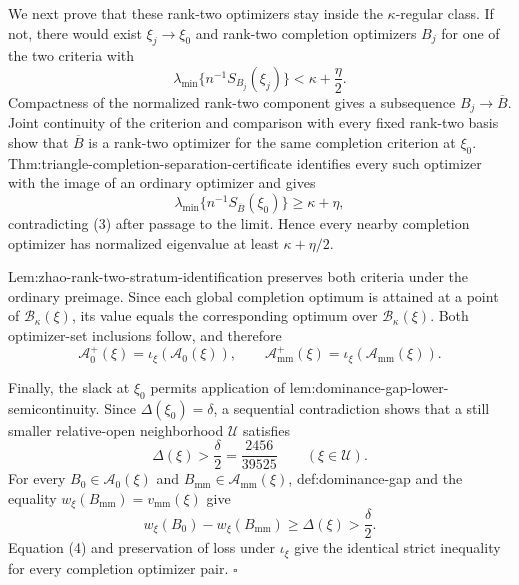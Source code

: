 We next prove that these rank-two optimizers stay inside the \(\kappa\)-regular class.  If not, there would exist \(\xi_j\to\xi_0\) and rank-two completion optimizers \(B_j\) for one of the two criteria with
\[
\lambda_{\min}\{n^{-1}S_{B_j}(\xi_j)\}<\kappa+\frac\eta2.        \tag{3}
\]
Compactness of the normalized rank-two component gives a subsequence \(B_j\to\overline B\).  Joint continuity of the criterion and comparison with every fixed rank-two basis show that \(\overline B\) is a rank-two optimizer for the same completion criterion at \(\xi_0\).  Thm:triangle-completion-separation-certificate identifies every such optimizer with the image of an ordinary optimizer and gives
\[
\lambda_{\min}\{n^{-1}S_{\overline B}(\xi_0)\}\ge\kappa+\eta,
\]
contradicting (3) after passage to the limit.  Hence every nearby completion optimizer has normalized eigenvalue at least \(\kappa+\eta/2\).

Lem:zhao-rank-two-stratum-identification preserves both criteria under the ordinary preimage.  Since each global completion optimum is attained at a point of \(\mathcal B_\kappa(\xi)\), its value equals the corresponding optimum over \(\mathcal B_\kappa(\xi)\).  Both optimizer-set inclusions follow, and therefore
\[
\mathcal A_0^+(\xi)=\iota_\xi(\mathcal A_0(\xi)),
\qquad
\mathcal A_{\mathrm{mm}}^+(\xi)
=\iota_\xi(\mathcal A_{\mathrm{mm}}(\xi)).                        \tag{4}
\]

Finally, the slack at \(\xi_0\) permits application of lem:dominance-gap-lower-semicontinuity.  Since \(\Delta(\xi_0)=\delta\), a sequential contradiction shows that a still smaller relative-open neighborhood \(\mathcal U\) satisfies
\[
\Delta(\xi)>\frac\delta2=\frac{2456}{39525}
\qquad(\xi\in\mathcal U).                                       \tag{5}
\]
For every \(B_0\in\mathcal A_0(\xi)\) and \(B_{\mathrm{mm}}\in\mathcal A_{\mathrm{mm}}(\xi)\), def:dominance-gap and the equality \(w_\xi(B_{\mathrm{mm}})=v_{\mathrm{mm}}(\xi)\) give
\[
w_\xi(B_0)-w_\xi(B_{\mathrm{mm}})\ge\Delta(\xi)>\frac\delta2.
\]
Equation (4) and preservation of loss under \(\iota_\xi\) give the identical strict inequality for every completion optimizer pair. \(\square\)